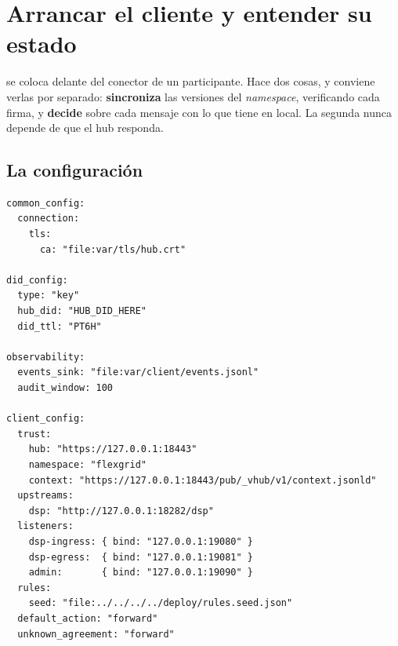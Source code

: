 \chapter{Arrancar el cliente y entender su estado}
\label{ch:cliente}

 se coloca delante del conector de un participante. Hace dos cosas, y conviene verlas
por separado: \textbf{sincroniza} las versiones del \emph{namespace}, verificando cada firma, y \textbf{decide}
sobre cada mensaje con lo que tiene en local. La segunda nunca depende de que el hub responda.

\section{La configuración}

\begin{lstlisting}[style=yaml]
common_config:
  connection:
    tls:
      ca: "file:var/tls/hub.crt"

did_config:
  type: "key"
  hub_did: "HUB_DID_HERE"
  did_ttl: "PT6H"

observability:
  events_sink: "file:var/client/events.jsonl"
  audit_window: 100

client_config:
  trust:
    hub: "https://127.0.0.1:18443"
    namespace: "flexgrid"
    context: "https://127.0.0.1:18443/pub/_vhub/v1/context.jsonld"
  upstreams:
    dsp: "http://127.0.0.1:18282/dsp"
  listeners:
    dsp-ingress: { bind: "127.0.0.1:19080" }
    dsp-egress:  { bind: "127.0.0.1:19081" }
    admin:       { bind: "127.0.0.1:19090" }
  rules:
    seed: "file:../../../../deploy/rules.seed.json"
  default_action: "forward"
  unknown_agreement: "forward"
\end{lstlisting}

